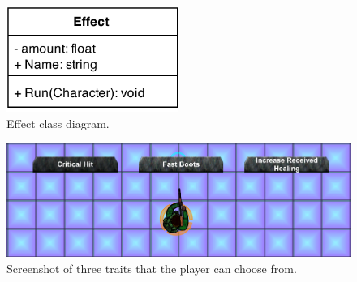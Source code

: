 \begin{figure}
\centering
\includegraphics[width=0.5\textwidth]{figures/traits/EffectClassDiagram.png}
\caption{Effect class diagram.}
\label{traits:effectclassdiagram}
\end{figure}


\begin{figure}
\centering
\includegraphics[scale=0.3]{figures/traits/Traits.png}
\caption{Screenshot of three traits that the player can choose from.}
\label{traits:traitselection:traits}
\end{figure}
